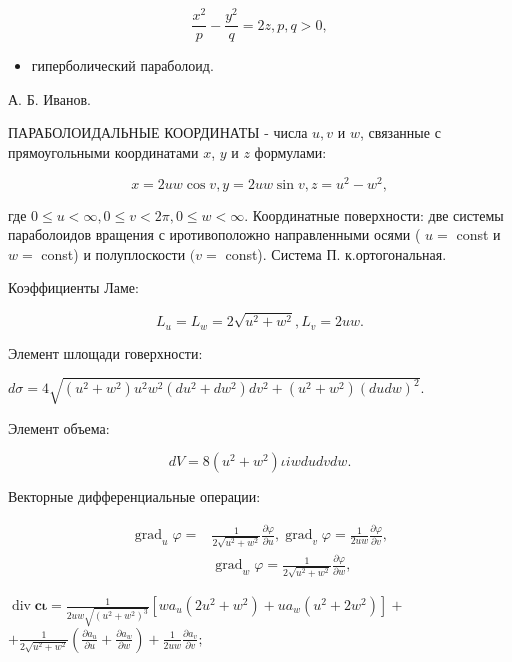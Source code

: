 \documentclass[10pt]{article}
\begin{document}
\[
\frac{x^{2}}{p}-\frac{y^{2}}{q}=2 z, p, q>0,
\]

\begin{itemize}
  \item гиперболический параболоид.
\end{itemize}

А. Б. Иванов.

ПАРАБОЛОИДАЛЬНЫЕ КООРДИНАТЫ - числа $u, v$ и $w$, связанные с прямоугольными координатами $x$, $y$ и $z$ формулами:

\[
x=2 u w \cos v, y=2 u w \sin v, z=u^{2}-w^{2},
\]

где $0 \leqslant u<\infty, 0 \leqslant v<2 \pi, 0 \leqslant w<\infty$. Координатные поверхности: две системы параболоидов вращения с иротивоположно направленными осями ( $u=$ const и $w=$ const) и полуплоскости $(v=$ const). Система П. к.ортогональная.

Коэффициенты Ламе:

\[
L_{u}=L_{w}=2 \sqrt{u^{2}+w^{2}}, L_{v}=2 u w .
\]

Элемент шлощади говерхности:

$d \sigma=4 \sqrt{\left(u^{2}+w^{2}\right) u^{2} w^{2}\left(d u^{2}+d w^{2}\right) d v^{2}+\left(u^{2}+w^{2}\right)(d u d w)^{2}}$.

Элемент объема:

\[
d V=8\left(u^{2}+w^{2}\right) \iota i w d u d v d w .
\]

Векторные дифференциальные операции:

\[
\begin{aligned}
\operatorname{grad}_{u} \varphi= & \frac{1}{2 \sqrt{u^{2}+w^{2}}} \frac{\partial \varphi}{\partial u}, \operatorname{grad}_{v} \varphi=\frac{1}{2 u w} \frac{\partial \varphi}{\partial v}, \\
& \operatorname{grad}_{w} \varphi=\frac{1}{2 \sqrt{u^{2}+w^{2}}} \frac{\partial \varphi}{\partial w},
\end{aligned}
\]

$\operatorname{div} \boldsymbol{c} \boldsymbol{\iota}=\frac{1}{2 u w \sqrt{\left(u^{2}+w^{2}\right)^{3}}}\left[w a_{u}\left(2 u^{2}+w^{2}\right)+u a_{w}\left(u^{2}+2 w^{2}\right)\right]+$ $+\frac{1}{2 \sqrt{u^{2}+w^{2}}}\left(\frac{\partial a_{u}}{\partial u}+\frac{\partial a_{w}}{\partial w}\right)+\frac{1}{2 u w} \frac{\partial a_{v}}{\partial v} ;$
\end{document}
